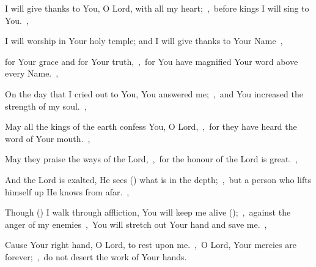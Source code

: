 \documentclass[12pt,twoside,a5paper]{article}
\begin{document}

\begin{normalparskip}
  I will give thanks to You, O Lord, with all my heart;~\sep\ before kings I will sing to You.~\sep


  I will worship in Your holy temple; and I will give thanks to Your Name~\sep

  for Your grace and for Your truth,~\sep\ for You have magnified Your word above every Name.~\sep

  On the day that I cried out to You, You answered me;~\sep\ and You increased the strength of my soul.~\sep

  May all the kings of the earth confess You, O Lord,~\sep\ for they have heard the word of Your mouth.~\sep

  May they praise the ways of the Lord,~\sep\ for the honour of the Lord is great.~\sep

  And the Lord is exalted, He sees () what is in the depth;~\sep\ but a person who lifts himself up He knows from afar.~\sep

  Though () I walk through affliction, You will keep me alive ();~\sep\ against the anger of my enemies~\sep\ You will stretch out Your hand and save me.~\sep

  Cause Your right hand, O Lord, to rest upon me.~\sep\ O Lord, Your mercies are forever;~\sep\ do not desert the work of Your hands.
\end{normalparskip}



\end{document}
